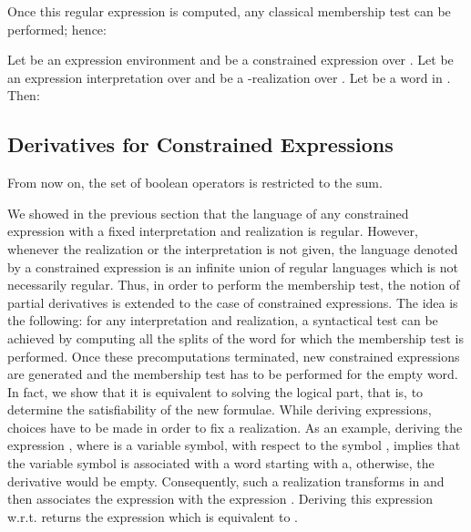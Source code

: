 \documentclass[a4paper]{llncs}
\begin{document}
 Once this regular
expression is computed, any classical membership test can be performed; hence:
  
  \begin{corollary}\label{cor i r lang rat}
    Let  be an expression environment and  be a constrained expression over . Let  be an expression interpretation over  and  be a -realization over . Let  be a word in . Then:
    
  \end{corollary}
  
  \subsection{Derivatives for Constrained Expressions}   
   
    \begin{remark}
From now on, the set of boolean operators is restricted to the sum.
  \end{remark}
  
 




We showed in the previous section that the language of any constrained expression with a fixed interpretation and realization is regular. However, whenever the realization or the interpretation is not given, the language denoted by a constrained expression is an infinite union of regular languages which is not necessarily regular. Thus, in order to perform the membership test, the notion of partial derivatives is extended to the case of constrained expressions.
The idea is the following: for any interpretation and realization, a syntactical test can be achieved by computing all the splits of the word for which the membership test is performed. Once these precomputations terminated, new constrained expressions are generated and the membership test has to be performed for the empty word. In fact, we show that it is equivalent to solving the logical part, that is, to determine the satisfiability of the new formulae.
   While deriving expressions, choices have to be made in order to fix a realization. As an example, deriving the expression , where  is a variable symbol, with respect to the symbol , implies that the variable symbol  is associated with a word starting with a, otherwise, the derivative would be empty. Consequently, such a realization transforms  in  and then associates the expression  with the expression . Deriving this expression w.r.t.  returns the expression  which is equivalent to .
  
\end{document}
